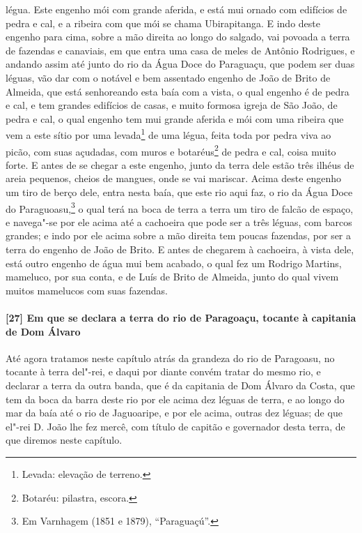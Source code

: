 \begin{linenumbers}
légua. Este engenho mói com grande aferida, e está mui ornado com edifícios de pedra e
cal, e a ribeira com que mói se chama Ubirapitanga. E indo deste engenho para cima, sobre
a mão direita ao longo do salgado, vai povoada a terra de fazendas e canaviais, em que
entra uma casa de meles de Antônio Rodrigues, e andando assim até junto do rio da Água
Doce do Paraguaçu, que podem ser duas léguas, vão dar com o notável e bem assentado
engenho de João de Brito de Almeida, que está senhoreando esta baía com a vista, o qual
engenho é de pedra e cal, e tem grandes edifícios de casas, e muito formosa igreja de São
João, de pedra e cal, o qual engenho tem mui grande aferida e mói com uma ribeira que vem
a este sítio por uma levada\footnote{ Levada: elevação de terreno.} de uma légua, feita
toda por pedra viva ao picão, com suas açudadas, com muros e botaréus\footnote{ Botaréu:
pilastra, escora.} de pedra e cal, coisa muito forte. E antes de se chegar a este engenho,
junto da terra dele estão três ilhéus de areia pequenos, cheios de mangues, onde se vai
mariscar. Acima deste engenho um tiro de berço dele, entra nesta baía, que este rio aqui
faz, o rio da Água Doce do Paraguoasu,\footnote{ Em Varnhagem (1851 e 1879),
``Paraguaçú''.} o qual terá na boca de terra a terra um tiro de falcão de espaço, e
navega"-se por ele acima até a cachoeira que pode ser a três léguas, com barcos grandes; e
indo por ele acima sobre a mão direita tem poucas fazendas, por ser a terra do engenho de
João de Brito. E antes de chegarem à cachoeira, à vista dele, está outro engenho de água
mui bem acabado, o qual fez um Rodrigo Martins, mameluco, por sua conta, e de Luís de
Brito de Almeida, junto do qual vivem muitos mamelucos com suas fazendas.

\paragraph{[27] Em que se declara a terra do rio de Paragoaçu, tocante à capitania de Dom
Álvaro}\quad
Até agora tratamos neste capítulo atrás da grandeza do rio de Paragoasu, no tocante à
terra del"-rei, e daqui por diante convém tratar do mesmo rio, e declarar a terra da outra
banda, que é da capitania de Dom Álvaro da Costa, que tem da boca da barra deste rio por
ele acima dez léguas de terra, e ao longo do mar da baía até o rio de Jaguoaripe, e por
ele acima, outras dez léguas; de que el"-rei D. João lhe fez mercê, com título de capitão e
governador desta terra, de que diremos neste capítulo.


\end{linenumbers}
